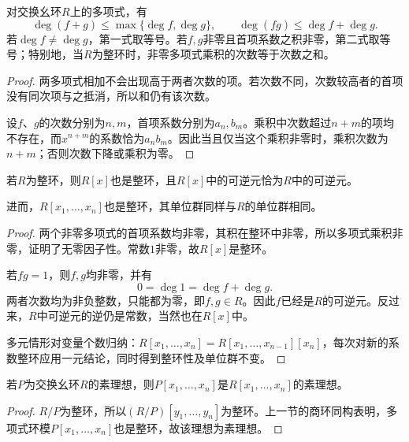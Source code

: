 \begin{proposition}
对交换幺环$R$上的多项式，有
\[
\deg(f+g)\le\max\{\deg f,\deg g\},\qquad
\deg(fg)\le\deg f+\deg g.
\]
若$\deg f\ne\deg g$，第一式取等号。若$f,g$非零且首项系数之积非零，第二式取等号；特别地，当$R$为整环时，非零多项式乘积的次数等于次数之和。
\end{proposition}
\begin{proof}
两多项式相加不会出现高于两者次数的项。若次数不同，次数较高者的首项没有同次项与之抵消，所以和仍有该次数。

设$f$、$g$的次数分别为$n,m$，首项系数分别为$a_n,b_m$。乘积中次数超过$n+m$的项均不存在，而$x^{n+m}$的系数恰为$a_nb_m$。因此当且仅当这个乘积非零时，乘积次数为$n+m$；否则次数下降或乘积为零。
\end{proof}

\begin{proposition}
若$R$为整环，则$R[x]$也是整环，且$R[x]$中的可逆元恰为$R$中的可逆元。

进而，$R[x_1,\ldots,x_n]$也是整环，其单位群同样与$R$的单位群相同。
\end{proposition}
\begin{proof}
两个非零多项式的首项系数均非零，其积在整环中非零，所以多项式乘积非零，证明了无零因子性。常数$1$非零，故$R[x]$是整环。

若$fg=1$，则$f,g$均非零，并有
\[
0=\deg1=\deg f+\deg g.
\]
两者次数均为非负整数，只能都为零，即$f,g\in R$。因此$f$已经是$R$的可逆元。反过来，$R$中可逆元的逆仍是常数，当然也在$R[x]$中。

多元情形对变量个数归纳：$R[x_1,\ldots,x_n]=R[x_1,\ldots,x_{n-1}][x_n]$，每次对新的系数整环应用一元结论，同时得到整环性及单位群不变。
\end{proof}

\begin{corollary}
若$P$为交换幺环$R$的素理想，则$P[x_1,\ldots,x_n]$是$R[x_1,\ldots,x_n]$的素理想。
\end{corollary}
\begin{proof}
$R/P$为整环，所以$(R/P)[y_1,\ldots,y_n]$为整环。上一节的商环同构表明，多项式环模$P[x_1,\ldots,x_n]$也是整环，故该理想为素理想。
\end{proof}

